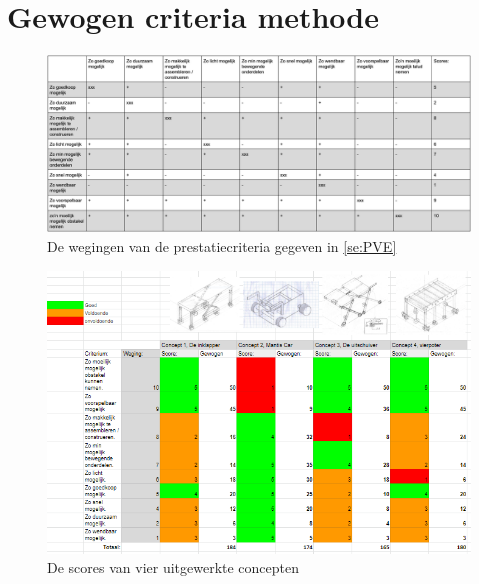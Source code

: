\chapter{Gewogen criteria methode}
\label{ch:gewogen_criteria_methode}
\newpage{}

\begin{figure}[H]
    \includegraphics[width=180mm, angle = 270]{06_bijlage_B/wegingen.png}
    \caption{De wegingen van de prestatiecriteria gegeven in \cref{se:PVE}}
    \label{fig:wegingen}
\end{figure}

\begin{figure}[H]
    \includegraphics[width=180mm, angle = 270]{06_bijlage_B/gegeven_scores_goed.PNG}
    \caption{De  scores van vier uitgewerkte concepten}
    \label{fig:conceptscores}
\end{figure}



